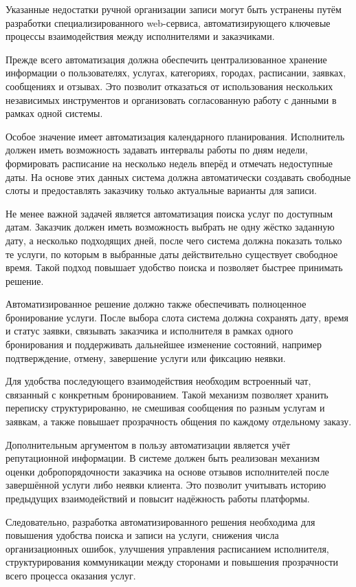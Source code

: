 Указанные недостатки ручной организации записи могут быть устранены путём разработки специализированного web-сервиса, автоматизирующего ключевые процессы взаимодействия между исполнителями и заказчиками.

Прежде всего автоматизация должна обеспечить централизованное хранение информации о пользователях, услугах, категориях, городах, расписании, заявках, сообщениях и отзывах. Это позволит отказаться от использования нескольких независимых инструментов и организовать согласованную работу с данными в рамках одной системы.

Особое значение имеет автоматизация календарного планирования. Исполнитель должен иметь возможность задавать интервалы работы по дням недели, формировать расписание на несколько недель вперёд и отмечать недоступные даты. На основе этих данных система должна автоматически создавать свободные слоты и предоставлять заказчику только актуальные варианты для записи.

Не менее важной задачей является автоматизация поиска услуг по доступным датам. Заказчик должен иметь возможность выбрать не одну жёстко заданную дату, а несколько подходящих дней, после чего система должна показать только те услуги, по которым в выбранные даты действительно существует свободное время. Такой подход повышает удобство поиска и позволяет быстрее принимать решение.

Автоматизированное решение должно также обеспечивать полноценное бронирование услуги. После выбора слота система должна сохранять дату, время и статус заявки, связывать заказчика и исполнителя в рамках одного бронирования и поддерживать дальнейшее изменение состояний, например подтверждение, отмену, завершение услуги или фиксацию неявки.

Для удобства последующего взаимодействия необходим встроенный чат, связанный с конкретным бронированием. Такой механизм позволяет хранить переписку структурированно, не смешивая сообщения по разным услугам и заявкам, а также повышает прозрачность общения по каждому отдельному заказу.

Дополнительным аргументом в пользу автоматизации является учёт репутационной информации. В системе должен быть реализован механизм оценки добропорядочности заказчика на основе отзывов исполнителей после завершённой услуги либо неявки клиента. Это позволит учитывать историю предыдущих взаимодействий и повысит надёжность работы платформы.

Следовательно, разработка автоматизированного решения необходима для повышения удобства поиска и записи на услуги, снижения числа организационных ошибок, улучшения управления расписанием исполнителя, структурирования коммуникации между сторонами и повышения прозрачности всего процесса оказания услуг.

